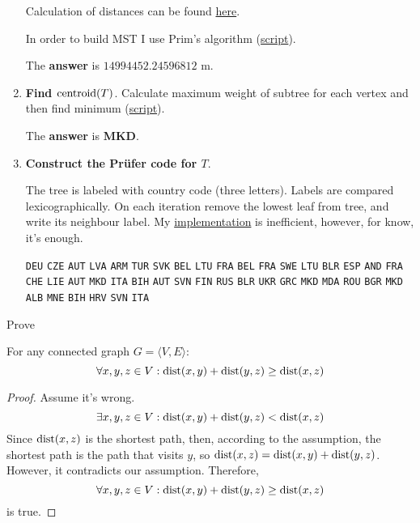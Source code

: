 \documentclass[12pt, a4paper]{article}
\begin{document}
\begin{enumerate}[label=\alph*)]
Calculation of distances can be found
\href{https://github.com/ablearthy-itmo-39828cf299f04949c86/discrete-math-2-hw-1/blob/832da1b/auto/mygraph/distances.py}{here}.

In order to build MST I use Prim's algorithm \cite{algoprim} (\href{https://github.com/ablearthy-itmo-39828cf299f04949c86/discrete-math-2-hw-1/blob/5337ff8/auto/mst.py}{script}).

The \textbf{answer} is \(14994452.24596812\) m.

\item \textbf{Find \(\operatorname{centroid}(T)\)}.
Calculate maximum weight of subtree for each vertex and then find minimum
(\href{https://github.com/ablearthy-itmo-39828cf299f04949c86/discrete-math-2-hw-1/blob/53131e2/auto/centroid.py}{script}).

The \textbf{answer} is \textbf{MKD}.

\item \textbf{Construct the Pr\"ufer code for \(T\)}.

The tree is labeled with country code (three letters). Labels are compared lexicographically.
On each iteration remove the lowest leaf from tree, and write its neighbour label.
My
\href{https://github.com/ablearthy-itmo-39828cf299f04949c86/discrete-math-2-hw-1/blob/b4044c9/auto/prufer_code.py}{implementation}
is inefficient, however, for know, it's enough.

\texttt{DEU} \texttt{CZE} \texttt{AUT} \texttt{LVA} \texttt{ARM} \texttt{TUR} \texttt{SVK} \texttt{BEL} \texttt{LTU} \texttt{FRA} \texttt{BEL} \texttt{FRA} \texttt{SWE} \texttt{LTU} \texttt{BLR} \texttt{ESP} \texttt{AND} \texttt{FRA} \texttt{CHE} \texttt{LIE} \texttt{AUT} \texttt{MKD} \texttt{ITA} \texttt{BIH} \texttt{AUT} \texttt{SVN} \texttt{FIN} \texttt{RUS} \texttt{BLR} \texttt{UKR} \texttt{GRC} \texttt{MKD} \texttt{MDA} \texttt{ROU} \texttt{BGR} \texttt{MKD} \texttt{ALB} \texttt{MNE} \texttt{BIH} \texttt{HRV} \texttt{SVN} \texttt{ITA}
\end{enumerate}

\problem Prove

\begin{theorem}
For any connected graph \(G = \langle V, E \rangle\):
\[\forall x,y,z \in V : \operatorname{dist}(x, y) + \operatorname{dist}(y, z) \ge \operatorname{dist}(x, z)\]
\end{theorem}

\begin{proof}
Assume it's wrong.
\[\exists x,y,z \in V : \operatorname{dist}(x, y) + \operatorname{dist}(y, z) < \operatorname{dist}(x, z)\]
Since \(\operatorname{dist}(x, z)\) is the shortest path, then, according to the assumption,
the shortest path is the path that visits \(y\), so \(\operatorname{dist}(x, z) = \operatorname{dist}(x, y) + \operatorname{dist}(y, z)\).
However, it contradicts our assumption. Therefore,
\[\forall x,y,z \in V : \operatorname{dist}(x, y) + \operatorname{dist}(y, z) \ge \operatorname{dist}(x, z)\]
is true.
\end{proof}
\end{document}
